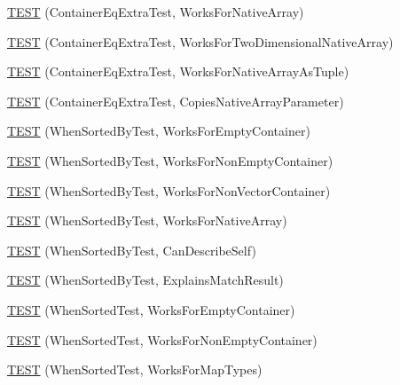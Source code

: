 \begin{DoxyCompactItemize}
\mbox{\hyperlink{namespacetesting_1_1gmock__matchers__test_ae5e5420340c8cf91d24af11feca669b0}{T\+E\+ST}} (Container\+Eq\+Extra\+Test, Works\+For\+Native\+Array)
\item 
\mbox{\hyperlink{namespacetesting_1_1gmock__matchers__test_a3cf0d2f2c08e34ca0b7e11ff27b4a7ca}{T\+E\+ST}} (Container\+Eq\+Extra\+Test, Works\+For\+Two\+Dimensional\+Native\+Array)
\item 
\mbox{\hyperlink{namespacetesting_1_1gmock__matchers__test_a94e4a2a02cde84ac51e37cda1813bc77}{T\+E\+ST}} (Container\+Eq\+Extra\+Test, Works\+For\+Native\+Array\+As\+Tuple)
\item 
\mbox{\hyperlink{namespacetesting_1_1gmock__matchers__test_af7a978384d567d133240fb1899ec1658}{T\+E\+ST}} (Container\+Eq\+Extra\+Test, Copies\+Native\+Array\+Parameter)
\item 
\mbox{\hyperlink{namespacetesting_1_1gmock__matchers__test_a9d88fbc6e2d01b66a1c10b192b25a802}{T\+E\+ST}} (When\+Sorted\+By\+Test, Works\+For\+Empty\+Container)
\item 
\mbox{\hyperlink{namespacetesting_1_1gmock__matchers__test_a3095e5533ec12a67377dec6b0769d9a8}{T\+E\+ST}} (When\+Sorted\+By\+Test, Works\+For\+Non\+Empty\+Container)
\item 
\mbox{\hyperlink{namespacetesting_1_1gmock__matchers__test_a24d3caacabfef918b7a5b9dacc5e3a66}{T\+E\+ST}} (When\+Sorted\+By\+Test, Works\+For\+Non\+Vector\+Container)
\item 
\mbox{\hyperlink{namespacetesting_1_1gmock__matchers__test_a33b65fc6db83270b5c29073dbbf69c4e}{T\+E\+ST}} (When\+Sorted\+By\+Test, Works\+For\+Native\+Array)
\item 
\mbox{\hyperlink{namespacetesting_1_1gmock__matchers__test_afc2d1e86837d8e3103748cb2e96b61c3}{T\+E\+ST}} (When\+Sorted\+By\+Test, Can\+Describe\+Self)
\item 
\mbox{\hyperlink{namespacetesting_1_1gmock__matchers__test_ada0850ab21beccb47802aab36c06d163}{T\+E\+ST}} (When\+Sorted\+By\+Test, Explains\+Match\+Result)
\item 
\mbox{\hyperlink{namespacetesting_1_1gmock__matchers__test_a76aaffd49c78fdee18f11fae5ea3f6fb}{T\+E\+ST}} (When\+Sorted\+Test, Works\+For\+Empty\+Container)
\item 
\mbox{\hyperlink{namespacetesting_1_1gmock__matchers__test_a2bfbef7e777d319e3d96fc98340bb558}{T\+E\+ST}} (When\+Sorted\+Test, Works\+For\+Non\+Empty\+Container)
\item 
\mbox{\hyperlink{namespacetesting_1_1gmock__matchers__test_acc4a96f3aa369fda8f554f5ac4495f4b}{T\+E\+ST}} (When\+Sorted\+Test, Works\+For\+Map\+Types)

\end{DoxyCompactItemize}
